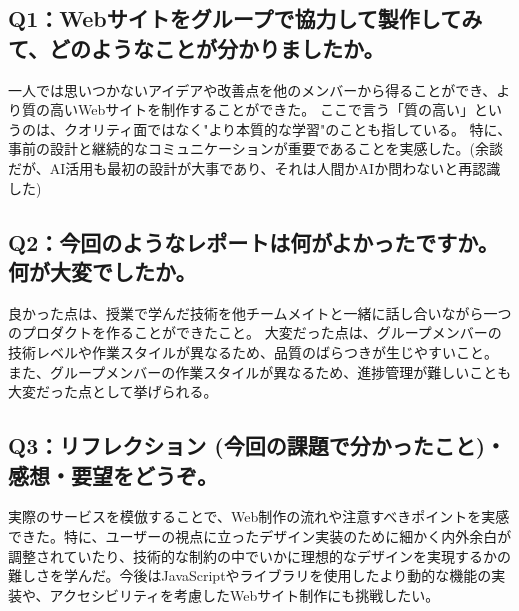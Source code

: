 \documentclass[12pt,a4j]{jarticle}
\begin{document}
\subsection{Q1：Webサイトをグループで協力して製作してみて、どのようなことが分かりましたか。}
一人では思いつかないアイデアや改善点を他のメンバーから得ることができ、より質の高いWebサイトを制作することができた。
ここで言う「質の高い」というのは、クオリティ面ではなく"より本質的な学習"のことも指している。
特に、事前の設計と継続的なコミュニケーションが重要であることを実感した。(余談だが、AI活用も最初の設計が大事であり、それは人間かAIか問わないと再認識した)

\subsection{Q2：今回のようなレポートは何がよかったですか。何が大変でしたか。}
良かった点は、授業で学んだ技術を他チームメイトと一緒に話し合いながら一つのプロダクトを作ることができたこと。
大変だった点は、グループメンバーの技術レベルや作業スタイルが異なるため、品質のばらつきが生じやすいこと。
また、グループメンバーの作業スタイルが異なるため、進捗管理が難しいことも大変だった点として挙げられる。

\subsection{Q3：リフレクション (今回の課題で分かったこと)・感想・要望をどうぞ。}
実際のサービスを模倣することで、Web制作の流れや注意すべきポイントを実感できた。特に、ユーザーの視点に立ったデザイン実装のために細かく内外余白が調整されていたり、技術的な制約の中でいかに理想的なデザインを実現するかの難しさを学んだ。今後はJavaScriptやライブラリを使用したより動的な機能の実装や、アクセシビリティを考慮したWebサイト制作にも挑戦したい。
\end{document}
